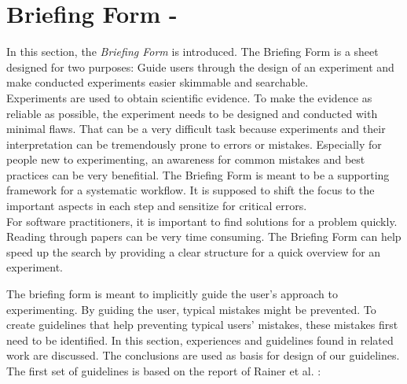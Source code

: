 

\section{Briefing Form - \briefingform}
In this section, the \textit{Briefing Form} is introduced. The Briefing Form is a sheet designed for two purposes: Guide users through the design of an experiment and make conducted experiments easier skimmable and searchable.\\
Experiments are used to obtain scientific evidence. To make the evidence as reliable as possible, the experiment needs to be designed and conducted with minimal flaws. That can be a very difficult task because experiments and their interpretation can be tremendously prone to errors or mistakes. Especially for people new to experimenting, an awareness for common mistakes and best practices can be very benefitial.
The Briefing Form is meant to be a  supporting framework for a systematic workflow. It is supposed to shift the focus to the important aspects in each step and sensitize for critical errors.\\
For software practitioners, it is important to find solutions for a problem quickly. Reading through papers can be very time consuming. The Briefing Form can help speed up the search by providing a clear structure for a quick overview for an experiment.

The briefing form is meant to implicitly guide the user's approach to experimenting.
By guiding the user, typical mistakes might be prevented.
To create guidelines that help preventing typical users' mistakes, these mistakes first need to be identified.
In this section, experiences and guidelines found in related work are discussed.
The conclusions are used as basis for design of our guidelines.
The first set of guidelines is based on the report of Rainer et al. \cite{Rainer2006}: